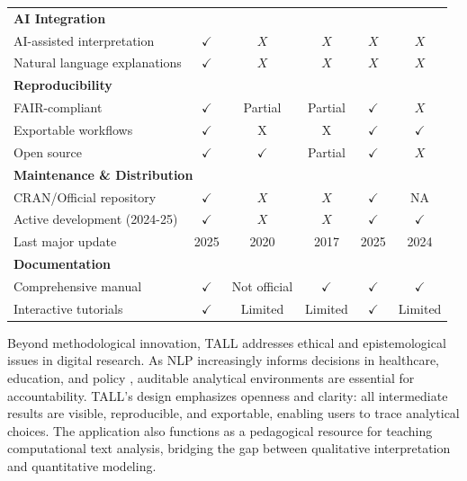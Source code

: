 \documentclass[preprint,12pt,a4paper]{elsarticle}
\begin{document}
\begin{table}[!ht]
{\begin{tabular}{lccccc}
\hline
\multicolumn{6}{l}{\textbf{AI Integration}} \\
AI-assisted interpretation & $\checkmark$ & $X$ & $X$ & $X$ & $X$ \\
Natural language explanations & $\checkmark$ & $X$ & $X$ & $X$ & $X$ \\
\hline
\multicolumn{6}{l}{\textbf{Reproducibility}} \\
FAIR-compliant & $\checkmark$ & Partial & Partial & $\checkmark$ & $X$ \\
Exportable workflows & $\checkmark$ & X & X & $\checkmark$ & $\checkmark$ \\
Open source & $\checkmark$ & $\checkmark$ & Partial & $\checkmark$ & $X$ \\
\hline
\multicolumn{6}{l}{\textbf{Maintenance \& Distribution}} \\
CRAN/Official repository & $\checkmark$ & $X$ & $X$ & $\checkmark$ & NA \\
Active development (2024-25) & $\checkmark$ & $X$ & $X$ & $\checkmark$ & $\checkmark$ \\
Last major update & 2025 & 2020 & 2017 & 2025 & 2024 \\
\hline
\multicolumn{6}{l}{\textbf{Documentation}} \\
Comprehensive manual & $\checkmark$ & Not official & $\checkmark$ & $\checkmark$ & $\checkmark$ \\
Interactive tutorials & $\checkmark$ & Limited & Limited & $\checkmark$ & Limited \\
\hline
\end{tabular}%
}
\end{table}

Beyond methodological innovation, TALL addresses ethical and epistemological issues in digital research. As NLP increasingly informs decisions in healthcare, education, and policy \cite[e.g.][]{che05,dim15,feu25}, auditable analytical environments are essential for accountability. TALL's design emphasizes openness and clarity: all intermediate results are visible, reproducible, and exportable, enabling users to trace analytical choices. The application also functions as a pedagogical resource for teaching computational text analysis, bridging the gap between qualitative interpretation and quantitative modeling.
\end{document}
